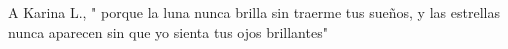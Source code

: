 \begin{dedication}
	
A Karina L., " porque la luna nunca brilla sin traerme tus sueños, y las estrellas nunca aparecen sin que yo sienta tus ojos brillantes" \cite{poe_annabel_2014} \\
\bigskip

\end{dedication}
